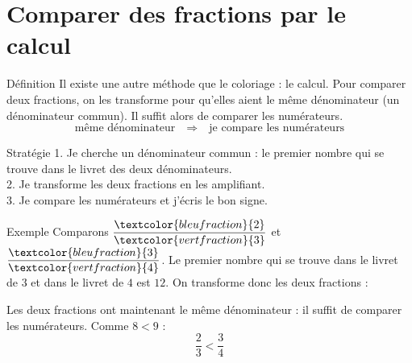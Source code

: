 \newpage
\section{Comparer des fractions par le calcul}\label{sec:ComparerCalcul}

\begin{regle}{Définition}
Il existe une autre méthode que le coloriage : le \textcolor{themeColor}{calcul}. Pour comparer deux fractions, on les transforme pour qu'elles aient le même dénominateur (un \textcolor{themeColor}{dénominateur commun}). Il suffit alors de comparer les numérateurs.
\[\text{même dénominateur} \quad\Longrightarrow\quad \text{je compare les numérateurs}\]
\end{regle}

\vspace{15pt}
\begin{astuce}{Stratégie}
\textcolor{themeColor}{1.} Je cherche un dénominateur commun : le premier nombre qui se trouve dans le livret des deux dénominateurs.\\
\textcolor{themeColor}{2.} Je transforme les deux fractions en les amplifiant.\\
\textcolor{themeColor}{3.} Je compare les numérateurs et j'écris le bon signe.
\end{astuce}

\vspace{15pt}
\begin{astuce}{Exemple}
Comparons $\dfrac{\textcolor{bleufraction}{2}}{\textcolor{vertfraction}{3}}$ et $\dfrac{\textcolor{bleufraction}{3}}{\textcolor{vertfraction}{4}}$. Le premier nombre qui se trouve dans le livret de $3$ et dans le livret de $4$ est $12$. On transforme donc les deux fractions :
\begin{center}
 \qquad\qquad {}
\end{center}
Les deux fractions ont maintenant le même dénominateur : il suffit de comparer les numérateurs. Comme $8<9$ :
\[\dfrac{2}{3}<\dfrac{3}{4}\]
\end{astuce}

\newpage



